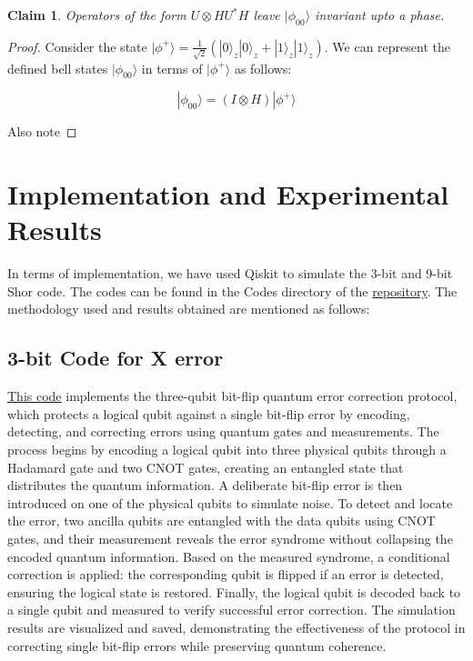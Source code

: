 \documentclass[conference]{IEEEtran}
\newtheorem{claim}{Claim}
\begin{document}
\begin{claim}
    Operators of the form $U \otimes HU^*H$ leave $| \phi_{00} \rangle$ invariant upto a phase.
\end{claim}

\begin{proof}
    Consider the state $| \phi^+ \rangle = \frac{1}{\sqrt{2}} (|0\rangle_z |0\rangle_z + |1\rangle_z |1\rangle_z)$. We can represent the defined bell states $| \phi_{00} \rangle$ in terms of $| \phi^+ \rangle$ as follows:

    \begin{equation}
        | \phi_{00} \rangle = (I \otimes H) | \phi^+ \rangle
    \end{equation}

    Also note 
\end{proof}

\section{Implementation and Experimental Results}
In terms of implementation, we have used Qiskit to simulate the 3-bit and 9-bit Shor code. The codes can be found in the Codes directory of the \href{https://github.com/jaymehta132/QuantumErrorCorrection-EE7001}{repository}. The methodology used and results obtained are mentioned as follows: 
\subsection{3-bit Code for X error}

\href{https://github.com/jaymehta132/QuantumErrorCorrection-EE7001/blob/main/Codes/scripts/3bitCode.py}{This code} implements the three-qubit bit-flip quantum error correction protocol, which protects a logical qubit against a single bit-flip error by encoding, detecting, and correcting errors using quantum gates and measurements. The process begins by encoding a logical qubit into three physical qubits through a Hadamard gate and two CNOT gates, creating an entangled state that distributes the quantum information. A deliberate bit-flip error is then introduced on one of the physical qubits to simulate noise. To detect and locate the error, two ancilla qubits are entangled with the data qubits using CNOT gates, and their measurement reveals the error syndrome without collapsing the encoded quantum information. Based on the measured syndrome, a conditional correction is applied: the corresponding qubit is flipped if an error is detected, ensuring the logical state is restored. Finally, the logical qubit is decoded back to a single qubit and measured to verify successful error correction. The simulation results are visualized and saved, demonstrating the effectiveness of the protocol in correcting single bit-flip errors while preserving quantum coherence.
\end{document}
